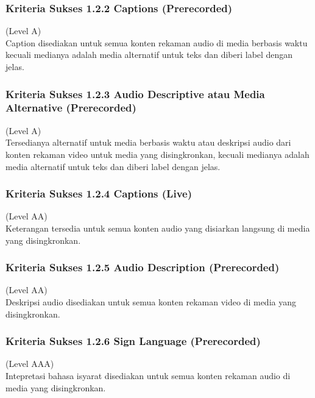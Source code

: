 \documentclass[a4paper,twoside]{article}
\begin{document}
\begin{enumerate}
		\subsubsection*{Kriteria Sukses 1.2.2 Captions (Prerecorded)}
		\label{subsubsec:kriteria_1.2.2}
		(Level A) \\
		
		Caption disediakan untuk semua konten rekaman audio di media berbasis waktu kecuali medianya adalah media alternatif untuk teks dan diberi label dengan jelas.
		
		
		\subsubsection*{Kriteria Sukses 1.2.3 Audio Descriptive atau Media Alternative (Prerecorded)}
		\label{subsubsec:kriteria_1.2.3}
		(Level A) \\
		
		Tersedianya alternatif untuk media berbasis waktu atau deskripsi audio dari konten rekaman video untuk media yang disingkronkan, kecuali medianya adalah media alternatif untuk teks dan diberi label dengan jelas.
		
		
		\subsubsection*{Kriteria Sukses 1.2.4 Captions (Live)}
		\label{subsubsec:kriteria_1.2.4}
		(Level AA) \\
		
		Keterangan tersedia untuk semua konten audio yang disiarkan langsung di media yang disingkronkan.
		
		
		\subsubsection*{Kriteria Sukses 1.2.5 Audio Description (Prerecorded)}
		\label{subsubsec:kriteria_1.2.5}
		(Level AA) \\
		
		Deskripsi audio disediakan untuk semua konten rekaman video di media yang disingkronkan.
		
		
		\subsubsection*{Kriteria Sukses 1.2.6 Sign Language (Prerecorded)}
		\label{subsubsec:kriteria_1.2.6}
		(Level AAA) \\
		
		Intepretasi bahasa isyarat disediakan untuk semua konten rekaman audio di media yang disingkronkan.
		

\end{enumerate}
\end{document}
